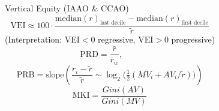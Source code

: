 \documentclass[aspectratio=169,10pt]{beamer}
\begin{document}
\begin{frame}{\frameC}
\begin{columns}[T,onlytextwidth]
  \begin{block}{Vertical Equity (IAAO  \& CCAO)}
  \[
  \mathrm{VEI}\approx 100\cdot\frac{\mathrm{median}(r)_{\text{last decile}}-\mathrm{median}(r)_{\text{first decile}}}{\tilde r}
  \]
  {\scriptsize
  (Interpretation: VEI$<0$ regressive,\; VEI$>0$ progressive)}
  \medskip
  \[
  \mathrm{PRD}=\frac{\bar r}{\bar r_w},\qquad
  \]
  \medskip
  \[
  \mathrm{PRB}=\text{slope}\!\left(\frac{r_i-\tilde r}{\tilde r}\sim
  \log_2\!\Big(\tfrac12(MV_i+AV_i/\tilde r)\Big)\right)
  \]
  \medskip
  \[
  \mathrm{MKI}=\frac{Gini\!\left(AV\right)}{Gini\!\left(MV\right)}
  \]
  \end{block}


\end{columns}

\end{frame}


\newcommand{\frameD}{Past models: linear vs nonlinear predictor}
\end{document}
